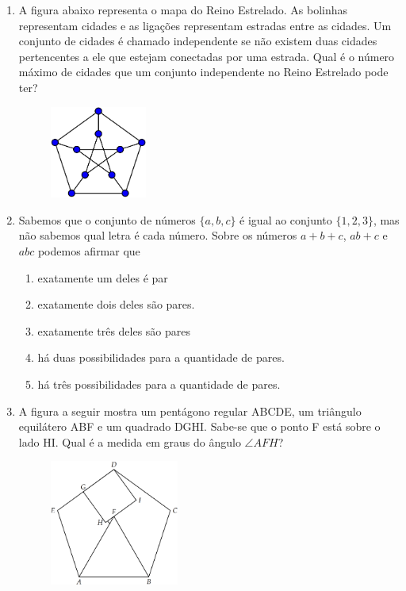 \documentclass[12pt]{article}
\begin{document}
\begin{enumerate}[label=\textbf{\arabic*.}]
        \item A figura abaixo representa o mapa do Reino Estrelado. As bolinhas representam cidades e as ligações representam estradas entre 
          as cidades. Um conjunto de cidades é chamado independente se não existem duas cidades pertencentes a ele que estejam conectadas por 
          uma estrada. Qual é o número máximo de cidades que um conjunto independente no Reino Estrelado pode ter?
          \begin{figure}[h]
            \centering
            \includegraphics[width=0.3\textwidth]{second.png}
          \end{figure}
        \item Sabemos que o conjunto de números \(\{a, b, c\}\) é igual ao conjunto \(\{1, 2, 3\}\), mas não sabemos qual letra é cada número.
          Sobre os números \(a+b+c\), \(ab+c\) e \(abc\) podemos afirmar que
          \begin{enumerate}[label=({\Alph*})]
            \item exatamente um deles é par
            \item exatamente dois deles são pares.
            \item exatamente três deles são pares
            \item há duas possibilidades para a quantidade de pares.
            \item há três possibilidades para a quantidade de pares.
          \end{enumerate}
        \item A figura a seguir mostra um pentágono regular ABCDE, um triângulo equilátero ABF e um quadrado DGHI. Sabe-se que o ponto F está
          sobre o lado HI. Qual é a medida em graus do ângulo \(\angle AFH\)?
          \begin{figure}[h]
            \centering
            \includegraphics[width=0.4\textwidth]{third.png}

\end{figure}
\end{enumerate}
\end{document}
